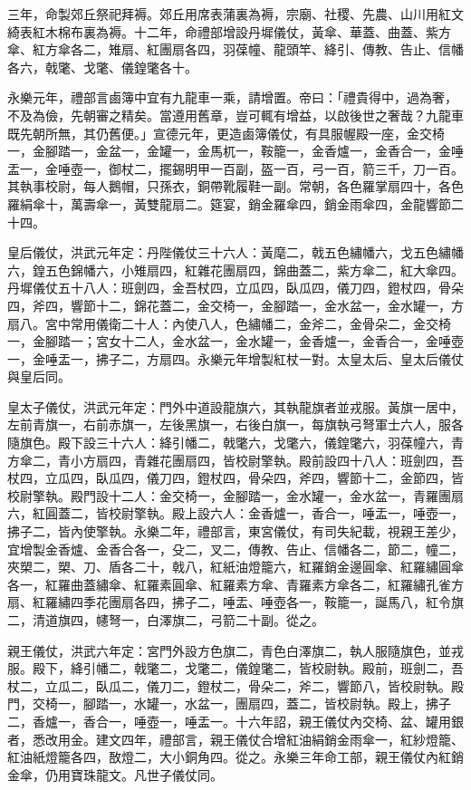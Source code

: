 \begin{pinyinscope}
三年，命製郊丘祭祀拜褥。郊丘用席表蒲裏為褥，宗廟、社稷、先農、山川用紅文綺表紅木棉布裏為褥。十二年，命禮部增設丹墀儀仗，黃傘、華蓋、曲蓋、紫方傘、紅方傘各二，雉扇、紅團扇各四，羽葆幢、龍頭竿、絳引、傳教、告止、信幡各六，戟氅、戈氅、儀鍠氅各十。

永樂元年，禮部言鹵簿中宜有九龍車一乘，請增置。帝曰：「禮貴得中，過為奢，不及為儉，先朝審之精矣。當遵用舊章，豈可輒有增益，以啟後世之奢哉？九龍車既先朝所無，其仍舊便。」宣德元年，更造鹵簿儀仗，有具服幄殿一座，金交椅一，金腳踏一，金盆一，金罐一，金馬杌一，鞍籠一，金香爐一，金香合一，金唾盂一，金唾壺一，御杖二，擺錫明甲一百副，盔一百，弓一百，箭三千，刀一百。其執事校尉，每人鵝帽，只孫衣，銅帶靴履鞋一副。常朝，各色羅掌扇四十，各色羅絹傘十，萬壽傘一，黃雙龍扇二。筵宴，銷金羅傘四，銷金雨傘四，金龍響節二十四。

皇后儀仗，洪武元年定：丹陛儀仗三十六人：黃麾二，戟五色繡幡六，戈五色繡幡六，鍠五色錦幡六，小雉扇四，紅雜花團扇四，錦曲蓋二，紫方傘二，紅大傘四。丹墀儀仗五十八人：班劍四，金吾杖四，立瓜四，臥瓜四，儀刀四，鐙杖四，骨朵四，斧四，響節十二，錦花蓋二，金交椅一，金腳踏一，金水盆一，金水罐一，方扇八。宮中常用儀衛二十人：內使八人，色繡幡二，金斧二，金骨朵二，金交椅一，金腳踏一；宮女十二人，金水盆一，金水罐一，金香爐一，金香合一，金唾壺一，金唾盂一，拂子二，方扇四。永樂元年增製紅杖一對。太皇太后、皇太后儀仗與皇后同。

皇太子儀仗，洪武元年定：門外中道設龍旗六，其執龍旗者並戎服。黃旗一居中，左前青旗一，右前赤旗一，左後黑旗一，右後白旗一，每旗執弓弩軍士六人，服各隨旗色。殿下設三十六人：絳引幡二，戟氅六，戈氅六，儀鍠氅六，羽葆幢六，青方傘二，青小方扇四，青雜花團扇四，皆校尉擎執。殿前設四十八人：班劍四，吾杖四，立瓜四，臥瓜四，儀刀四，鐙杖四，骨朵四，斧四，響節十二，金節四，皆校尉擎執。殿門設十二人：金交椅一，金腳踏一，金水罐一，金水盆一，青羅團扇六，紅圓蓋二，皆校尉擎執。殿上設六人：金香爐一，香合一，唾盂一，唾壺一，拂子二，皆內使擎執。永樂二年，禮部言，東宮儀仗，有司失紀載，視親王差少，宜增製金香爐、金香合各一，殳二，叉二，傳教、告止、信幡各二，節二，幢二，夾槊二，槊、刀、盾各二十，戟八，紅紙油燈籠六，紅羅銷金邊圓傘、紅羅繡圓傘各一，紅羅曲蓋繡傘、紅羅素圓傘、紅羅素方傘、青羅素方傘各二，紅羅繡孔雀方扇、紅羅繡四季花團扇各四，拂子二，唾盂、唾壺各一，鞍籠一，誕馬八，紅令旗二，清道旗四，幰弩一，白澤旗二，弓箭二十副。從之。

親王儀仗，洪武六年定：宮門外設方色旗二，青色白澤旗二，執人服隨旗色，並戎服。殿下，絳引幡二，戟氅二，戈氅二，儀鍠氅二，皆校尉執。殿前，班劍二，吾杖二，立瓜二，臥瓜二，儀刀二，鐙杖二，骨朵二，斧二，響節八，皆校尉執。殿門，交椅一，腳踏一，水罐一，水盆一，團扇四，蓋二，皆校尉執。殿上，拂子二，香爐一，香合一，唾壺一，唾盂一。十六年詔，親王儀仗內交椅、盆、罐用銀者，悉改用金。建文四年，禮部言，親王儀仗合增紅油絹銷金雨傘一，紅紗燈籠、紅油紙燈籠各四，敔燈二，大小銅角四。從之。永樂三年命工部，親王儀仗內紅銷金傘，仍用寶珠龍文。凡世子儀仗同。


\end{pinyinscope}

